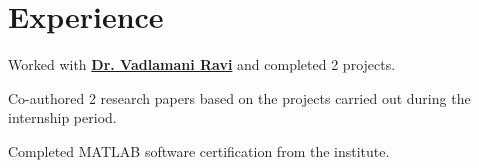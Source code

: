 \documentclass[]{resume}
\begin{document}
\begin{minipage}[t]{0.66\textwidth} 


\section{Experience}
\sectionsep

\vspace{\topsep} %
\begin{tightemize}
\item Worked with \textbf{\href{http://www.idrbt.ac.in/vravi.html}{Dr. Vadlamani Ravi}} and completed 2 projects.
\item Co-authored 2 research papers based on the projects carried out during the internship period.
\item Completed MATLAB software certification from the institute.
\end{tightemize}
\sectionsep




\end{minipage}
\end{document}
